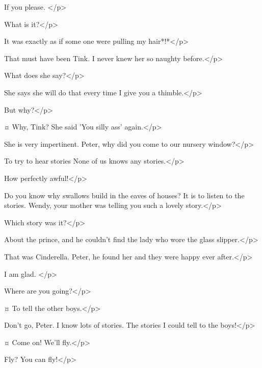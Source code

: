 \wendyspeaks
If you please.
</p>

\peterspeaks
What is it?</p>

\wendyspeaks
It was exactly as if some one were pulling my hair*!*</p>

\peterspeaks
That must have been Tink.
I never knew her so naughty before.</p>


\wendyspeaks
What does she say?</p>

\peterspeaks
She says she will do that every time I give you a thimble.</p>

\wendyspeaks
But why?</p>

\peterspeaks {}¤
Why, Tink?
She said 'You silly ass' again.</p>

\wendyspeaks
She is very impertinent.
Peter, why did you come to our nursery window?</p>

\peterspeaks
To try to hear stories None of us knows any stories.</p>

\wendyspeaks
How perfectly awful!</p>

\peterspeaks
Do you know why swallows build in the eaves of houses?
It is to listen to the stories.
Wendy, your mother was telling you such a lovely story.</p>

\wendyspeaks
Which story was it?</p>

\peterspeaks
About the prince, and he couldn't find the lady who wore the glass slipper.</p>

\wendyspeaks
That was Cinderella.
Peter, he found her and they were happy ever after.</p>

\peterspeaks
I am glad.
</p>

\wendyspeaks
Where are you going?</p>

\peterspeaks {}¤
To tell the other boys.</p>

\wendyspeaks
Don't go, Peter.
I know lots of stories.
The stories I could tell to the boys!</p>

\peterspeaks {}¤
Come on!
We'll fly.</p>

\wendyspeaks
Fly?
You can fly!</p>



